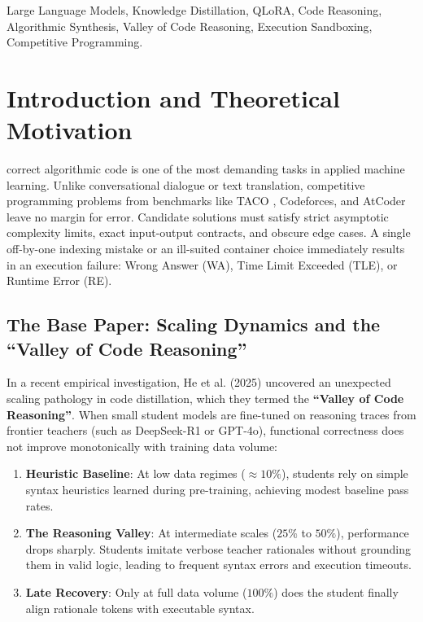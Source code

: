 \documentclass[journal]{IEEEtran}
\begin{document}
\begin{IEEEkeywords}
Large Language Models, Knowledge Distillation, QLoRA, Code Reasoning, Algorithmic Synthesis, Valley of Code Reasoning, Execution Sandboxing, Competitive Programming.
\end{IEEEkeywords}

\section{Introduction and Theoretical Motivation}
 correct algorithmic code is one of the most demanding tasks in applied machine learning. Unlike conversational dialogue or text translation, competitive programming problems from benchmarks like TACO \cite{li2023taco}, Codeforces, and AtCoder leave no margin for error. Candidate solutions must satisfy strict asymptotic complexity limits, exact input-output contracts, and obscure edge cases. A single off-by-one indexing mistake or an ill-suited container choice immediately results in an execution failure: Wrong Answer (WA), Time Limit Exceeded (TLE), or Runtime Error (RE).

\subsection{The Base Paper: Scaling Dynamics and the ``Valley of Code Reasoning''}
In a recent empirical investigation, He et al. (2025) \cite{he2025valley} uncovered an unexpected scaling pathology in code distillation, which they termed the \textbf{``Valley of Code Reasoning''}. When small student models are fine-tuned on reasoning traces from frontier teachers (such as DeepSeek-R1 or GPT-4o), functional correctness does not improve monotonically with training data volume:
\begin{enumerate}
    \item \textbf{Heuristic Baseline}: At low data regimes ($\approx 10\%$), students rely on simple syntax heuristics learned during pre-training, achieving modest baseline pass rates.
    \item \textbf{The Reasoning Valley}: At intermediate scales ($25\%$ to $50\%$), performance drops sharply. Students imitate verbose teacher rationales without grounding them in valid logic, leading to frequent syntax errors and execution timeouts.
    \item \textbf{Late Recovery}: Only at full data volume ($100\%$) does the student finally align rationale tokens with executable syntax.
\end{enumerate}
\end{document}
